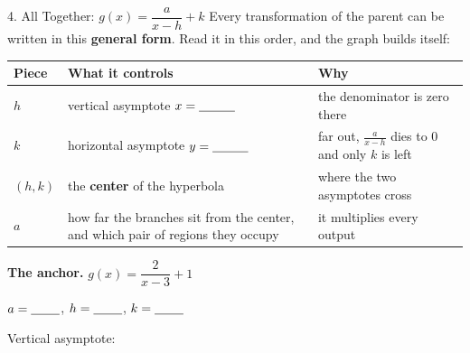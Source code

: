 \documentclass[10pt]{article}
\newcommand{\lgrid}[4]{%
  \draw[step=1, linegray!40, very thin] (#1,#3) grid (#2,#4);
  \draw[->, semithick, charcoal] (#1,0)--(#2,0) node[below right, font=\scriptsize]{$x$};
  \draw[->, semithick, charcoal] (0,#3)--(0,#4) node[left, font=\scriptsize]{$y$};}
\begin{document}
\begin{notesbox}{4. All Together: $g(x)=\dfrac{a}{x-h}+k$}
Every transformation of the parent can be written in this \textbf{general form}. Read it in this order,
and the graph builds itself:
\begin{center}
\renewcommand{\arraystretch}{1.35}
\begin{tabularx}{\linewidth}{@{}l l X@{}}
\hline
\textbf{Piece} & \textbf{What it controls} & \textbf{Why} \\
\hline
$h$ & vertical asymptote $x=\blank{1.0cm}$ & the denominator is zero there \\
$k$ & horizontal asymptote $y=\blank{1.0cm}$ & far out, $\frac{a}{x-h}$ dies to $0$ and only $k$ is left \\
$(h,k)$ & the \textbf{center} of the hyperbola & where the two asymptotes cross \\
$a$ & how far the branches sit from the center, and which pair of regions they occupy & it multiplies every output \\
\hline
\end{tabularx}
\end{center}

\vspace{3pt}
\textbf{The anchor.} \; $g(x)=\dfrac{2}{x-3}+1$
\begin{center}
\begin{minipage}{0.50\linewidth}\centering
{}
\end{minipage}%
\begin{minipage}{0.48\linewidth}
\small
$a=\blank{0.8cm}$, \quad $h=\blank{0.8cm}$, \quad $k=\blank{0.8cm}$

\vspace{3pt}
Vertical asymptote: \blank{1.4cm}


\end{minipage}
\end{center}
\end{notesbox}
\end{document}
